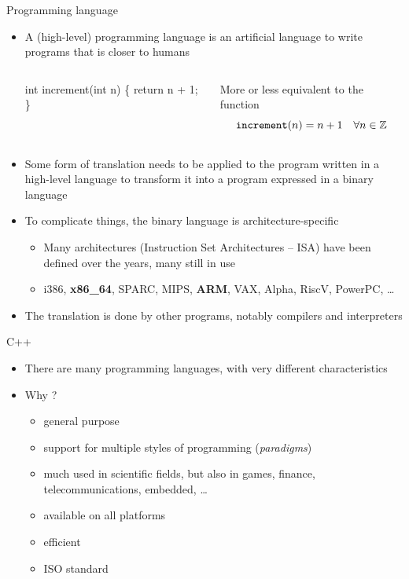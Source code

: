 \begin{frame}[fragile]{Programming language}
  \begin{itemize}
  \item<1-> A (high-level) programming language is an artificial language to write
    programs that is closer to humans
    \begin{columns}
      \begin{column}{.5\textwidth}
    \begin{codeblock}
int increment(int n)
\{
  return n + 1;
\}\end{codeblock}        
      \end{column}
      \begin{column}{.5\textwidth}
        {\smaller More or less equivalent to the function}
        \[
          \verb|increment|(n) = n + 1 \quad \forall n \in \mathbb{Z}
        \]
      \end{column}
    \end{columns}
\item<2-> Some form of translation needs to be applied to the program written in a
  high-level language to transform it into a program expressed in a binary
  language
\item<3-> To complicate things, the binary language is architecture-specific
  \begin{itemize}[<.->]
  \item Many architectures (Instruction Set Architectures -- ISA) have been
    defined over the years, many still in use
  \item i386, \textbf{x86_64}, SPARC, MIPS, \textbf{ARM}, VAX, Alpha, RiscV,
    PowerPC, \ldots
  \end{itemize}
\item<4-> The translation is done by other programs, notably \alert{compilers} and
  interpreters
\end{itemize}

\end{frame}

\begin{frame}{C++}

  \begin{itemize}[<+->]
  \item There are many programming languages, with very different characteristics
  \item Why \Cpp{}?
    \begin{itemize}[<.->]
    \item general purpose
    \item support for multiple styles of programming (\textit{paradigms})
    \item much used in scientific fields, but also in games, finance,
      telecommunications, embedded, \ldots
    \item available on all platforms
    \item efficient
    \item ISO standard
    \end{itemize}
  \end{itemize}
\end{frame}

